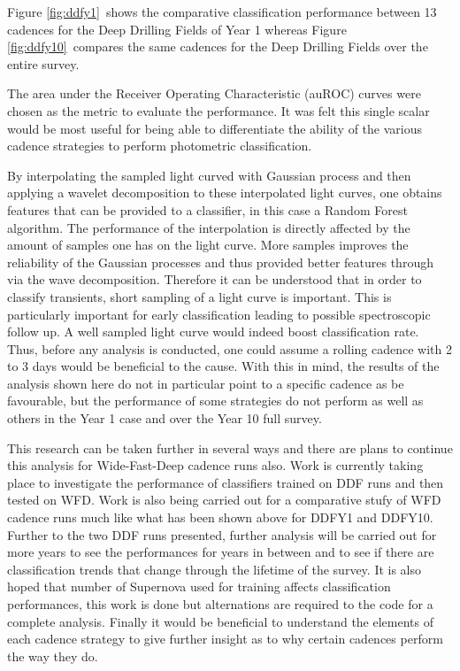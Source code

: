 Figure \ref{fig:ddfy1}~shows the comparative classification performance between 13 cadences for the Deep
Drilling Fields of Year 1 whereas Figure \ref{fig:ddfy10}~compares the same
cadences for the Deep Drilling Fields over the entire survey.

The area under the Receiver Operating Characteristic (auROC) curves were chosen as the metric
to evaluate the performance. It was felt this single scalar would be most useful
for being able to differentiate the ability of the various cadence strategies
to perform photometric classification.



By interpolating the sampled light curved with Gaussian process and then applying a
wavelet decomposition to these interpolated light curves, one obtains features
that can be provided to a classifier, in this case a Random Forest algorithm.
The performance of the interpolation is directly affected by the amount of
samples one has on the light curve. More samples improves the reliability of the
Gaussian processes and thus provided better features through via the wave decomposition. Therefore it can be understood that in order to classify transients, short sampling of a light
curve is important. This is particularly important for early classification
leading to possible spectroscopic follow up. A well sampled light curve would
indeed boost classification rate. Thus, before any analysis is conducted, one
could assume a rolling cadence with 2 to 3 days would be beneficial to the
cause.
With this in mind, the results of the analysis shown here do not in particular
point to a specific cadence as be favourable, but the performance of some
strategies do not perform as well as others in the Year 1 case and over the
Year 10 full survey.


This research can be taken further in several ways and there are plans to
continue this analysis for Wide-Fast-Deep cadence runs also. Work is currently
taking place to investigate the performance of classifiers trained on DDF runs
and then tested on WFD. Work is also being carried out for a comparative stufy
of WFD cadence runs much like what has been shown above for DDFY1 and DDFY10.
Further to the two DDF runs presented, further analysis will be carried out for
more years to see the performances for years in between and to see if there
are classification trends that change through the lifetime of the survey. It is
also hoped that number of Supernova used for training affects classification
performances, this work is done but alternations are required to the code for a complete
analysis. Finally it would be beneficial to understand the elements of each cadence
strategy to give further insight as to why certain cadences perform the way they do.

